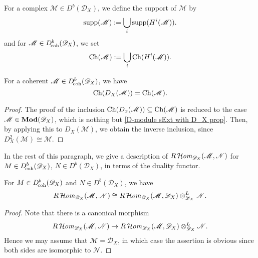 For a complex $\mathscr{M}\in D^b(\mathscr{D}_X)$, we define the support of $\mathscr{M}$ by
\[\mathrm{supp}(\mathscr{M}):=\bigcup_i\mathrm{supp}(H^i(\mathscr{M})).\]
and for $\mathscr{M}\in D^b_{\!\mathrm{coh}}(\mathscr{D}_X)$, we set
\[\mathrm{Ch}(\mathscr{M}):=\bigcup_i\mathrm{Ch}(H^i(\mathscr{M})).\]
\begin{proposition}\label{D-module dual of coh characteristic variety char}
For a coherent $\mathscr{M}\in D_{\!\mathrm{coh}}^b(\mathscr{D}_X)$, we have
\[\mathrm{Ch}(D_X(\mathscr{M}))=\mathrm{Ch}(\mathscr{M}).\]
\end{proposition}
\begin{proof}
The proof of the inclusion $\mathrm{Ch}(D_x(\mathscr{M}))\subseteq\mathrm{Ch}(\mathscr{M})$ is reduced to the case $\mathscr{M}\in\mathbf{Mod}(\mathscr{D}_X)$, which is nothing but \cref{D-module sExt with D_X prop}. Then, by applying this to $D_X(\mathscr{M})$, we obtain the inverse inclusion, since $D_X^2(\mathscr{M})\cong\mathscr{M}$.
\end{proof}

In the rest of this paragraph, we give a description of $R\operatorname{\mathcal{H}\hspace*{-0.4pt}\textit{om}\hspace{0.5pt}}_{\mathscr{D}_X}(\mathscr{M},\mathscr{N})$ for $M\in D^b_{\!\mathrm{coh}}(\mathscr{D}_X)$, $N\in D^b(\mathscr{D}_X)$, in terms of the duality functor.

\begin{lemma}\label{D-module Hom and tensor with dual isomorphic for coh}
For $M\in D^b_{\!\mathrm{coh}}(\mathscr{D}_X)$ and $N\in D^b(\mathscr{D}_X)$, we have
\[R\operatorname{\mathcal{H}\hspace*{-0.4pt}\textit{om}\hspace{0.5pt}}_{\mathscr{D}_X}(\mathscr{M},\mathscr{N})\cong R\operatorname{\mathcal{H}\hspace*{-0.4pt}\textit{om}\hspace{0.5pt}}_{\mathscr{D}_X}(\mathscr{M},\mathscr{D}_X)\otimes_{\mathscr{D}_X}^L\mathscr{N}.\]
\end{lemma}
\begin{proof}
Note that there is a canonical morphism
\[R\operatorname{\mathcal{H}\hspace*{-0.4pt}\textit{om}\hspace{0.5pt}}_{\mathscr{D}_X}(\mathscr{M},\mathscr{N})\to  R\operatorname{\mathcal{H}\hspace*{-0.4pt}\textit{om}\hspace{0.5pt}}_{\mathscr{D}_X}(\mathscr{M},\mathscr{D}_X)\otimes_{\mathscr{D}_X}^L\mathscr{N}.\]
Hence we may assume that $\mathscr{M}=\mathscr{D}_X$, in which case the assertion is obvious since both sides are isomorphic to $\mathscr{N}$.
\end{proof}


